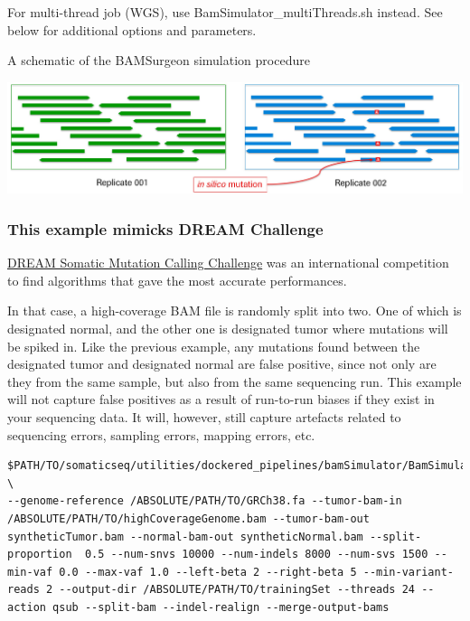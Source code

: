 \documentclass[10pt,letterpaper]{article}
\begin{document}
\begin{sloppypar}
For multi-thread job (WGS), use BamSimulator\_multiThreads.sh instead. See below for additional options and parameters.


A schematic of the BAMSurgeon simulation procedure


\begin{center}
 \includegraphics[width=6.5in]{../utilities/dockered_pipelines/bamSimulator/replicate_sim.jpg}
\end{center}





\subsubsection{This example mimicks DREAM Challenge}

\href{https://www.synapse.org/#!Synapse:syn312572/wiki/70726}{DREAM Somatic Mutation Calling Challenge} was an international competition to find algorithms that gave the most accurate performances. 

In that case, a high-coverage BAM file is randomly split into two. One of which is designated normal, and the other one is designated tumor where mutations will be spiked in. Like the previous example, any mutations found between the designated tumor and designated normal are false positive, since not only are they from the same sample, but also from the same sequencing run. This example will not capture false positives as a result of run-to-run biases if they exist in your sequencing data. It will, however, still capture artefacts related to sequencing errors, sampling errors, mapping errors, etc.


\begin{lstlisting}
$PATH/TO/somaticseq/utilities/dockered_pipelines/bamSimulator/BamSimulator_multiThreads.sh \
--genome-reference /ABSOLUTE/PATH/TO/GRCh38.fa --tumor-bam-in /ABSOLUTE/PATH/TO/highCoverageGenome.bam --tumor-bam-out syntheticTumor.bam --normal-bam-out syntheticNormal.bam --split-proportion  0.5 --num-snvs 10000 --num-indels 8000 --num-svs 1500 --min-vaf 0.0 --max-vaf 1.0 --left-beta 2 --right-beta 5 --min-variant-reads 2 --output-dir /ABSOLUTE/PATH/TO/trainingSet --threads 24 --action qsub --split-bam --indel-realign --merge-output-bams
\end{lstlisting}


\end{sloppypar}
\end{document}
